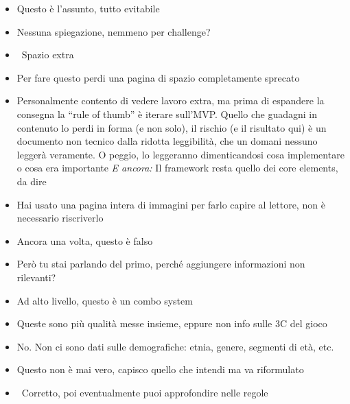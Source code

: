 {\begin{itemize}
  \item {} Questo è l'assunto, tutto evitabile
  \item {} Nessuna spiegazione, nemmeno per challenge?
  \item \rvVuoto\ Spazio extra
  \item {} Per fare questo perdi una pagina di spazio completamente sprecato
  \item {} Personalmente contento di vedere lavoro extra, ma prima di espandere la consegna la ``rule of thumb'' è iterare sull'MVP. Quello che guadagni in contenuto lo perdi in forma (e non solo), il rischio (e il risultato qui) è un documento non tecnico dalla ridotta leggibilità, che un domani nessuno leggerà veramente. O peggio, lo leggeranno dimenticandosi cosa implementare o cosa era importante \emph{E ancora:} Il framework resta quello dei core elements, da dire
  \item {} Hai usato una pagina intera di immagini per farlo capire al lettore, non è necessario riscriverlo
  \item {} Ancora una volta, questo è falso
  \item {} Però tu stai parlando del primo, perché aggiungere informazioni non rilevanti?
  \item {} Ad alto livello, questo è un combo system
  \item {} Queste sono più qualità messe insieme, eppure non info sulle 3C del gioco
  \item {} No. Non ci sono dati sulle demografiche: etnia, genere, segmenti di età, etc.
  \item {} Questo non è mai vero, capisco quello che intendi ma va riformulato
  \item {} \rvBene\ Corretto, poi eventualmente puoi approfondire nelle regole

\end{itemize}}
